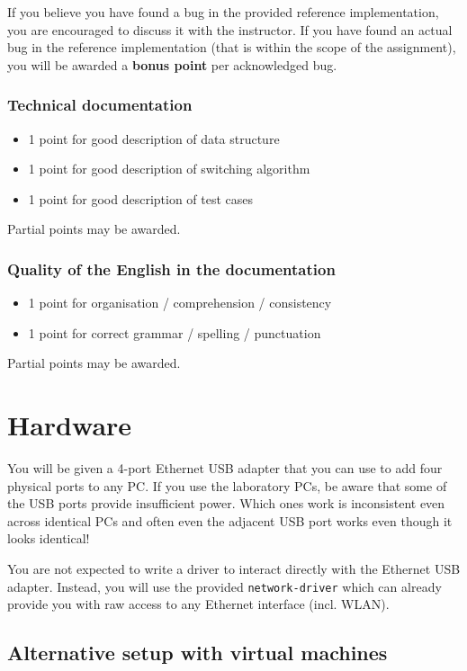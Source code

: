 \documentclass{article}
\begin{document}
If you believe you have found a bug in the provided reference
implementation, you are encouraged to discuss it with the
instructor. If you have found an actual bug in the reference
implementation (that is within the scope of the assignment), you will
be awarded a {\bf bonus point} per acknowledged bug.


\subsubsection{Technical documentation}
\begin{itemize}
\item 1 point for good description of data structure
\item 1 point for good description of switching algorithm
\item 1 point for good description of test cases
\end{itemize}
Partial points may be awarded.

\subsubsection{Quality of the English in the documentation}

\begin{itemize}
\item 1 point for organisation / comprehension / consistency
\item 1 point for correct grammar / spelling / punctuation
\end{itemize}
Partial points may be awarded.



\section{Hardware}

You will be given a 4-port Ethernet USB adapter that you can use to
add four physical ports to any PC.  If you use the laboratory PCs, be
aware that some of the USB ports provide insufficient power. Which
ones work is inconsistent even across identical PCs and often even the
adjacent USB port works even though it looks identical!

You are not expected to write a driver to interact directly with the
Ethernet USB adapter.  Instead, you will use the provided
{\tt network-driver} which can already provide you with raw access
to any Ethernet interface (incl. WLAN).

\subsection{Alternative setup with virtual machines}
\end{document}
